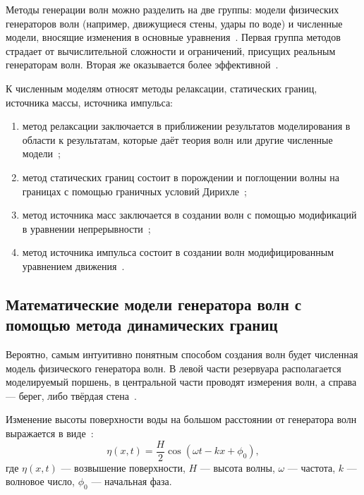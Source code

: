 Методы генерации волн можно разделить на две группы: модели физических генераторов волн 
(например, движущиеся стены, удары по воде) и численные модели, вносящие изменения в основные уравнения~\cite{Windt2019_ImpulseNWM}.
%
Первая группа методов страдает от вычислительной сложности и ограничений, присущих реальным генераторам волн.
Вторая же оказывается более эффективной~\cite{Windt2019_ImpulseNWM}.

К численным моделям относят методы релаксации, статических границ, источника массы, источника импульса:
\begin{enumerate}
    \item метод релаксации заключается в приближении результатов моделирования в области к результатам, которые даёт теория волн или другие численные модели~\cite{Jacobsen2012, Schmitt2015, Alomare2018, Ni2013};
    \item метод статических границ состоит в порождении и поглощении волны на границах с помощью граничных условий Дирихле~\cite{Windt2019_ImpulseNWM};
    \item метод источника масс заключается в создании волн с помощью модификаций в уравнении непрерывности~\cite{Schmitt2015};
    \item метод источника импульса состоит в создании волн модифицированным уравнением движения~\cite{Windt2019_ImpulseNWM, Schmitt2015}.
\end{enumerate}

\subsection{Математические модели генератора волн с помощью метода динамических границ}

Вероятно, самым интуитивно понятным способом создания волн будет численная модель физического генератора волн.
В левой части резервуара располагается моделируемый поршень, в центральной части проводят измерения волн, 
а справа --- берег, либо твёрдая стена~\cite{Lu2021, Monaghan1994}. 

Изменение высоты поверхности воды на большом расстоянии от генератора волн выражается в виде~\cite{Altomare2017, Dean1991}:
\begin{equation}
    \eta(x,t) = \frac{H}{2}\cos(\omega t - kx + \phi_{0}),
\end{equation}
%
где $\eta(x,t)$ --- возвышение поверхности, 
$H$ --- высота волны, 
$\omega$ --- частота, 
$k$ --- волновое число, 
$\phi_{0}$ --- начальная фаза.

